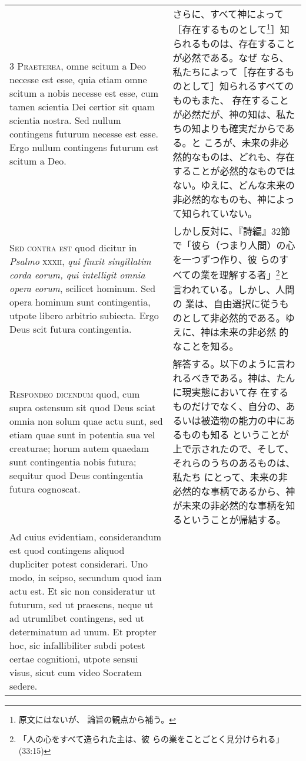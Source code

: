 \documentclass[10pt]{jsarticle} %
\begin{document}
\begin{longtable}{p{21em}p{21em}}
\\


3 {\scshape Praeterea}, omne scitum a Deo necesse est esse, quia etiam
omne scitum a nobis necesse est esse, cum tamen scientia Dei certior
sit quam scientia nostra. Sed nullum contingens futurum necesse est
esse. Ergo nullum contingens futurum est scitum a Deo.

&

さらに、すべて神によって［存在するものとして\footnote{原文にはないが、
論旨の観点から補う。}］知られるものは、存在することが必然である。なぜ
なら、私たちによって［存在するものとして］知られるすべてのものもまた、
存在することが必然だが、神の知は、私たちの知よりも確実だからである。と
ころが、未来の非必然的なものは、どれも、存在することが必然的なものでは
ない。ゆえに、どんな未来の非必然的なものも、神によって知られていない。

\\


{\scshape Sed contra est} quod dicitur in {\itshape Psalmo} {\scshape
xxxii}, {\itshape qui finxit singillatim corda eorum, qui intelligit
omnia opera eorum}, scilicet hominum. Sed opera hominum sunt
contingentia, utpote libero arbitrio subiecta. Ergo Deus scit futura
contingentia.


&

しかし反対に、『詩編』32節で「彼ら（つまり人間）の心を一つずつ作り、彼
らのすべての業を理解する者」\footnote{「人の心をすべて造られた主は、彼
らの業をことごとく見分けられる」(33:15)}と言われている。しかし、人間の
業は、自由選択に従うものとして非必然的である。ゆえに、神は未来の非必然
的なことを知る。

\\


{\scshape Respondeo dicendum} quod, cum supra ostensum sit quod Deus
sciat omnia non solum quae actu sunt, sed etiam quae sunt in potentia
sua vel creaturae; horum autem quaedam sunt contingentia nobis futura;
sequitur quod Deus contingentia futura cognoscat.


&

解答する。以下のように言われるべきである。神は、たんに現実態において存
在するものだけでなく、自分の、あるいは被造物の能力の中にあるものも知る
ということが上で示されたので、そして、それらのうちのあるものは、私たち
にとって、未来の非必然的な事柄であるから、神が未来の非必然的な事柄を知
るということが帰結する。

\\


Ad cuius evidentiam, considerandum est quod contingens aliquod
dupliciter potest considerari. Uno modo, in seipso, secundum quod iam
actu est. Et sic non consideratur ut futurum, sed ut praesens, neque
ut ad utrumlibet contingens, sed ut determinatum ad unum. Et propter
hoc, sic infallibiliter subdi potest certae cognitioni, utpote sensui
visus, sicut cum video Socratem sedere.


\end{longtable}
\end{document}
